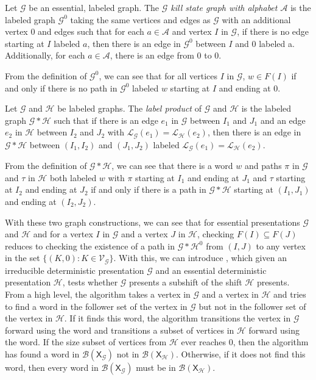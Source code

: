 \documentclass[hidelinks]{report}
\newcommand{\Ac}{\mathcal{A}}  %
\newcommand{\Lc}{\mathcal{L}}  %
\newcommand{\Gc}{\mathcal{G}}  %
\newcommand{\Hc}{\mathcal{H}}  %
\newcommand{\Vc}{\mathcal{V}}
\newcommand{\Bc}{\mathcal{B}}
\newcommand{\shift}[1]{\mathsf{X}_{#1}}
\newcommand{\term}[1]{\textit{#1}}
\theoremstyle{definition}
\begin{document}
\begin{definition}
    Let \(\Gc\) be an essential, labeled graph. The \term{\(\Gc\) kill state graph with alphabet \(\Ac\)}
    is the labeled graph \(\Gc^0\) taking the same vertices and edges as \(\Gc\) with 
    an additional vertex \(0\) and edges such that for each \(a \in \Ac\) and vertex \(I\) in \(\Gc\),
    if there is no edge starting at \(I\) labeled \(a\), then there is an edge in \(\Gc^0\) 
    between \(I\) and \(0\) labeled a. Additionally, for each \(a \in \Ac\), there is an 
    edge from \(0\) to \(0\).
\end{definition}

From the definition of \(\Gc^0\), we can see that for 
all vertices \(I\) in \(\Gc\), \(w \in F(I)\) if and only if 
there is no path in \(\Gc^0\) labeled \(w\) starting at \(I\) and ending at \(0\).

\begin{definition}
    Let \(\Gc\) and \(\Hc\) be labeled graphs. The \term{label product} of \(\Gc\) and \(\Hc\)
    is the labeled graph \(\Gc * \Hc\) such that if there is an edge \(e_1\) in \(\Gc\)
    between \(I_1\) and \(J_1\) and an edge \(e_2\) in \(\Hc\) between \(I_2\) and \(J_2\)
    with \(\Lc_\Gc(e_1) = \Lc_\Hc(e_2)\), then there is an edge in \(\Gc * \Hc\) between 
    \((I_1, I_2)\) and \((J_1, J_2)\) labeled \(\Lc_\Gc(e_1) = \Lc_\Hc(e_2)\).
\end{definition}

From the definition of \(\Gc * \Hc\), we can see that there is a word \(w\) and 
paths \(\pi\) in \(\Gc\) and \(\tau\) in \(\Hc\) both labeled \(w\) with
\(\pi\) starting at \(I_1\) and ending at \(J_1\) and \(\tau\) starting at \(I_2\)
and ending at \(J_2\)
if and only if there is a path in \(\Gc*\Hc\) starting at \((I_1, J_1)\) and 
ending at \((I_2, J_2)\).

With these two graph constructions, we can see that for essential presentations \(\Gc\) and 
\(\Hc\) and for a vertex 
\(I\) in \(\Gc\) and a vertex \(J\) in \(\Hc\), checking \(F(I) \subseteq F(J)\)
reduces to checking the existence of a path in \(\Gc * \Hc^0\) from \((I, J)\) to 
any vertex in the set \(\{(K, 0) : K \in \Vc_\Gc\}\). With this, we 
can introduce , which given an irreducible deterministic presentation \(\Gc\)
and an essential deterministic presentation \(\Hc\), tests whether \(\Gc\)
presents a subshift of the shift \(\Hc\) presents. From a high 
level, the algorithm takes a vertex in \(\Gc\) and a vertex in \(\Hc\) and 
tries to find a word in the follower set of the vertex in \(\Gc\) but 
not in the follower set of the vertex in \(\Hc\). If it finds this word, 
the algorithm transitions the vertex in \(\Gc\) forward using the word and
transitions a subset of vertices in \(\Hc\) forward using the word. If 
the size subset of vertices from \(\Hc\) ever reaches \(0\), then 
the algorithm has found a word in \(\Bc(\shift{\Gc})\) not in \(\Bc(\shift{\Hc})\). 
Otherwise, if it does not find this word, then every word in \(\Bc(\shift{\Gc})\) must be in \(\Bc(\shift{\Hc})\).
\end{document}
